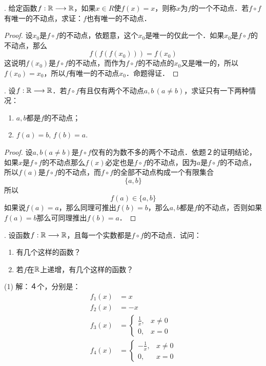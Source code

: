 . 给定函数$f: \mathbb{R} \longrightarrow \mathbb{R}$，如果$x \in R$使$f(x)=x$，则称$x$为$f$的一个不动点．若$f \circ  f$有唯一的不动点，求证：$f$也有唯一的不动点．

\begin{proof}
设$x_0$是$f \circ f$的不动点，依题意，这个$x_0$是唯一的仅此一个．如果$x_0$是$f \circ f$的不动点，那么
\begin{equation}
    f(f(f(x_0))) = f(x_0)
\end{equation}
这说明$f(x_0)$是$f \circ f$的不动点，而作为$f \circ f$的不动点的$x_0$又是唯一的，所以$f(x_0) = x_0$，所以$f$有唯一的不动点$x_0$．命题得证．
\end{proof}

. 设$f: \mathbb{R} \longrightarrow \mathbb{R}$．若$f \circ f$有且仅有两个不动点$a, b\,(a \neq b)$，求证只有一下两种情况：
\begin{enumerate}
    \item $a, b$都是$f$的不动点；
    \item $f(a) = b, \, f(b) = a$.
\end{enumerate}

\begin{proof}
设$a, b (a \neq b)$是$f \circ f$仅有的为数不多的两个不动点．依题２的证明结论，如果$x$是$f \circ f$的不动点那么$f(x)$必定也是$f \circ f$的不动点，因为$a$是$f \circ f$的不动点，所以$f(a)$是$f \circ f$的不动点，而$f \circ f$的全部不动点构成一个有限集合
\begin{equation}
    \{ a, b \}
\end{equation}
所以
\begin{equation}
    f(a) \in \{a, b \}
\end{equation}
如果说$f(a) = a$，那么同理可推出$f(b)=b$，那么$a, b$都是$f$的不动点，否则如果$f(a) = b$那么可同理推出$f(b)=a$．
\end{proof}

. 设函数$f: \mathbb{R} \longrightarrow \mathbb{R}$，且每一个实数都是$f \circ f$的不动点．试问：
\begin{enumerate}
    \item 有几个这样的函数？
    \item 若$f$在$\mathbb{R}$上递增，有几个这样的函数？
\end{enumerate}

\noindent (1) 解：４个，分别是：
\begin{align}
    f_1(x) &= x \\
    f_2(x) &= -x \\
    f_3(x) &= \begin{cases}
        \displaystyle\frac{1}{x}, & x \neq 0 \\
        0, & x = 0
    \end{cases} \\
    f_4(x) &= \begin{cases}
        \displaystyle-\frac{1}{x}, & x \neq 0 \\
        0, & x = 0
    \end{cases}
\end{align}

